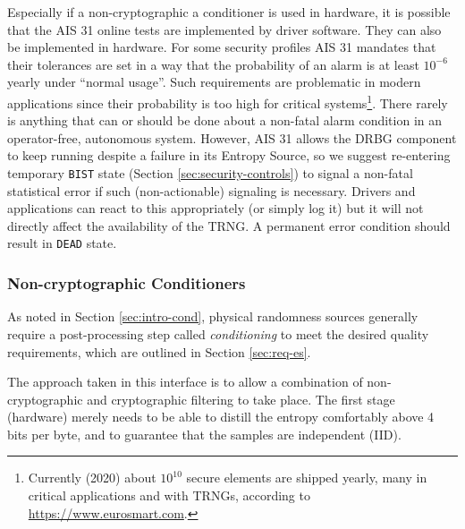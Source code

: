     Especially if a non-cryptographic a conditioner is used in hardware,
    it is possible that the AIS 31 \cite{KiSc11} online tests are
    implemented by driver software. They can also be implemented in hardware.
    For some security profiles AIS 31 mandates that their tolerances are
    set in a way that the probability of an alarm is at least $10^{-6}$
    yearly under ``normal usage''. Such requirements are problematic
    in modern applications since their probability is too high for
    critical systems\footnote{Currently (2020) about $10^{10}$ secure
    elements are shipped yearly, many in critical applications and with
    TRNGs, according to \url{https://www.eurosmart.com}.}.
    There rarely is anything that can or should be done about a non-fatal
    alarm condition in an operator-free, autonomous system. However,
    AIS 31 allows the DRBG component to keep running despite a failure in
    its Entropy Source, so we suggest re-entering temporary \verb|BIST|
    state (Section \ref{sec:security-controls}) to signal a non-fatal
    statistical error if such (non-actionable) signaling is necessary.
    Drivers and applications can react to this appropriately (or simply
    log it) but it will not directly affect the availability of the TRNG.
    A permanent error condition should result in \verb|DEAD| state.

\subsubsection{Non-cryptographic Conditioners}
\label{sec:noncrypto}

    As noted in Section \ref{sec:intro-cond}, physical randomness sources
    generally require a post-processing step called \emph{conditioning} to
    meet the desired quality requirements, which  are outlined in Section
    \ref{sec:req-es}.

    The approach taken in this interface is to allow a combination of
    non-cryptographic and cryptographic filtering to take place. The
    first stage (hardware) merely needs to be able to distill the entropy
    comfortably above 4 bits per byte, and to guarantee that the samples
    are independent (IID).

